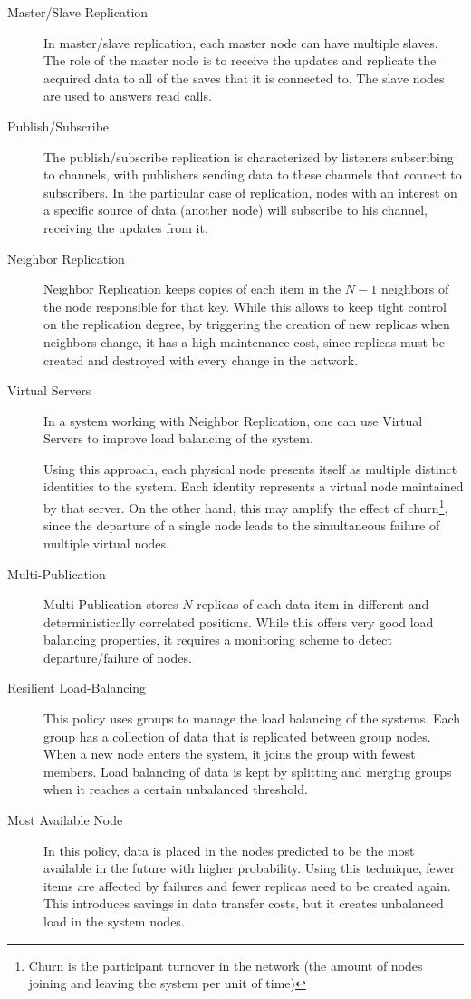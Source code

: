 \begin{description}

\item[Master/Slave Replication] In master/slave replication, each master node can have multiple slaves. The role of the master node is to receive the updates and replicate the acquired data to all of the saves that it is connected to. The slave nodes are used to answers read calls.

\item[Publish/Subscribe] The publish/subscribe replication is characterized by listeners subscribing to channels, with publishers sending data to these channels that connect to subscribers. In the particular case of replication, nodes with an interest on a specific source of data (another node) will subscribe to his channel, receiving the updates from it.

\item[Neighbor Replication] Neighbor Replication keeps copies of each item in the $N-1$ neighbors of the node responsible for that key. While this allows to keep tight control on the replication degree, by triggering the creation of new replicas when neighbors change, it has a high maintenance cost, since replicas must be created and destroyed with every change in the network.

\item[Virtual Servers] In a system working with Neighbor Replication, one can use Virtual Servers to improve load balancing of the system.\par
	Using this approach, each physical node presents itself as multiple distinct identities to the system. Each identity represents a virtual node maintained by that server. On the other hand, this may amplify the effect of churn\footnote{Churn is the participant turnover in the network (the amount of nodes joining and leaving the system per unit of time)}, since the departure of a single node leads to the simultaneous failure of multiple virtual nodes.

\item[Multi-Publication] Multi-Publication stores $N$
replicas of each data item in different and deterministically correlated positions. While this offers very good load balancing properties, it requires a monitoring scheme to detect departure/failure of nodes.

\item[Resilient Load-Balancing] This policy uses groups to manage the load balancing of the systems. Each group has a collection of data that is replicated between group nodes. When a new node enters the system, it joins the group with fewest members. Load balancing of data is kept by splitting and merging groups when it reaches a certain unbalanced threshold.

\item[Most Available Node] In this policy, data is placed in the nodes predicted to be the most available in the future with higher probability. Using this technique, fewer items are affected by failures and fewer replicas need to be created again. This introduces savings in data transfer costs, but it creates unbalanced load in the system nodes.

\end{description}

